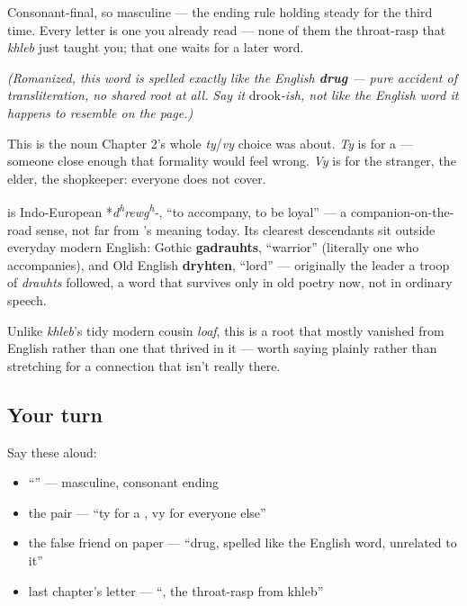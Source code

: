 Consonant-final, so masculine — the ending rule holding steady for the third time. Every letter is one you already read — none of them the throat-rasp \textbf{} that \emph{khleb} just taught you; that one waits for a later word.

\emph{(Romanized, this word is spelled exactly like the English \textbf{drug} — pure accident of transliteration, no shared root at all. Say it }drook\emph{-ish, not like the English word it happens to resemble on the page.)}

This is the noun Chapter 2's whole \emph{ty}/\emph{vy} choice was about. \emph{Ty} is for a \emph{} — someone close enough that formality would feel wrong. \emph{Vy} is for the stranger, the elder, the shopkeeper: everyone \emph{} does not cover.

\begin{cousinweb}
\textbf{} is Indo-European *\emph{d\textsuperscript{h}rewg\textsuperscript{h}-}, \textquotedblleft{}to accompany, to be loyal\textquotedblright{} — a companion-on-the-road sense, not far from \emph{}'s meaning today. Its clearest descendants sit outside everyday modern English: Gothic \textbf{gadrauhts}, \textquotedblleft{}warrior\textquotedblright{} (literally one who accompanies), and Old English \textbf{dryhten}, \textquotedblleft{}lord\textquotedblright{} — originally the leader a troop of \emph{drauhts} followed, a word that survives only in old poetry now, not in ordinary speech.

Unlike \emph{khleb}'s tidy modern cousin \emph{loaf}, this is a root that mostly vanished from English rather than one that thrived in it — worth saying plainly rather than stretching for a connection that isn't really there.
\end{cousinweb}

\subsection*{Your turn}
Say these aloud:

\begin{itemize}
\raggedright
  \item \textquotedblleft{}\textquotedblright{} — masculine, consonant ending
  \item the pair — \textquotedblleft{}ty for a , vy for everyone else\textquotedblright{}
  \item the false friend on paper — \textquotedblleft{}drug, spelled like the English word, unrelated to it\textquotedblright{}
  \item last chapter's letter — \textquotedblleft{}, the throat-rasp from khleb\textquotedblright{}
\end{itemize}

